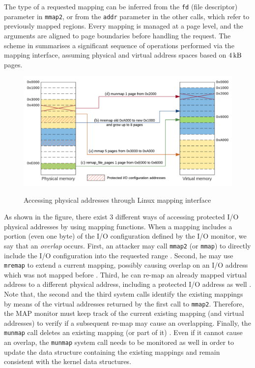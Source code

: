 The type of a requested mapping can be inferred from the \verb|fd| (file descriptor) parameter in \verb|mmap2|,
or from the \verb|addr| parameter in the other calls, which refer to previously mapped regions.
Every mapping is managed at a page level, and the arguments are aligned to page boundaries before handling the request.
The scheme in  summarises a significant sequence of operations performed via the mapping interface,
assuming physical and virtual address spaces based on $\SI{4}{\kilo\byte}$ pages.
\begin{figure}[h]
\centerline{
\includegraphics[width=\textwidth]{res/map-linux}}
\caption{Accessing physical addresses through Linux mapping interface \label{fig:map-linux}}
{\ignorespaces\label{fig:mmap}}
{\ignorespaces\label{fig:mremap}}
{\ignorespaces\label{fig:remapfp}}
{\ignorespaces\label{fig:munmap}}
\end{figure}
As shown in the figure, there exist $3$ different ways of accessing protected I/O physical addresses by using mapping functions.
When a mapping includes a portion (even one byte) of the I/O configuration defined by the I/O monitor, we say that an \emph{overlap} occurs.
First, an attacker may call \verb|mmap2| (or \verb|mmap|) to directly include the I/O configuration into the requested range .
Second, he may use \verb|mremap| to extend a current mapping, possibly causing overlap on an I/O address which was not mapped before .
Third, he can re-map an already mapped virtual address to a different physical address, including a protected I/O address as well .
Note that, the second and the third system calls identify the existing mappings by means of the virtual addresses returned by the first call to \verb|mmap2|.
Therefore, the MAP monitor must keep track of the current existing mapping (and virtual addresses) to verify if a subsequent re-map may cause an overlapping.
Finally, the \verb|munmap| call deletes an existing mapping (or part of it) . Even if it cannot cause an overlap,
the \verb|munmap| system call needs to be monitored as well in order to update the data structure containing the existing mappings and remain
consistent with the kernel data structures.

